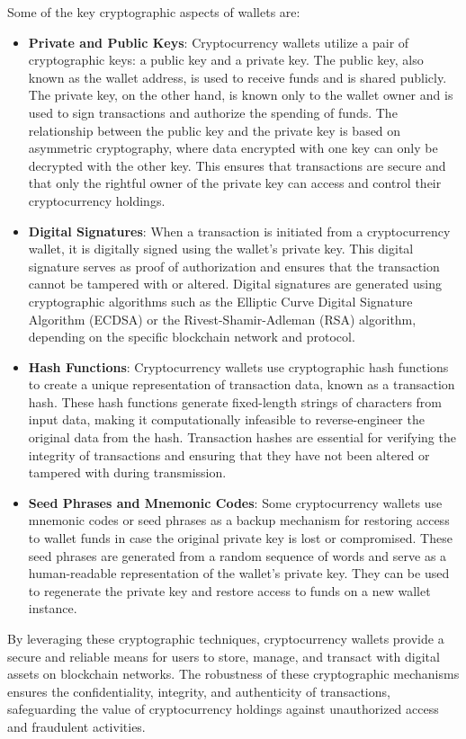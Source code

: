 Some of the key cryptographic aspects of wallets are:
\begin{itemize}
    \item \textbf{Private and Public Keys}: Cryptocurrency wallets utilize a pair of cryptographic keys: a public key and a private key. The public key, also known as the wallet address, is used to receive funds and is shared publicly. The private key, on the other hand, is known only to the wallet owner and is used to sign transactions and authorize the spending of funds. The relationship between the public key and the private key is based on asymmetric cryptography, where data encrypted with one key can only be decrypted with the other key. This ensures that transactions are secure and that only the rightful owner of the private key can access and control their cryptocurrency holdings.
    \item \textbf{Digital Signatures}: When a transaction is initiated from a cryptocurrency wallet, it is digitally signed using the wallet's private key. This digital signature serves as proof of authorization and ensures that the transaction cannot be tampered with or altered. Digital signatures are generated using cryptographic algorithms such as the Elliptic Curve Digital Signature Algorithm (ECDSA) or the Rivest-Shamir-Adleman (RSA) algorithm, depending on the specific blockchain network and protocol.
    \item \textbf{Hash Functions}: Cryptocurrency wallets use cryptographic hash functions to create a unique representation of transaction data, known as a transaction hash. These hash functions generate fixed-length strings of characters from input data, making it computationally infeasible to reverse-engineer the original data from the hash. Transaction hashes are essential for verifying the integrity of transactions and ensuring that they have not been altered or tampered with during transmission.
    \item \textbf{Seed Phrases and Mnemonic Codes}: Some cryptocurrency wallets use mnemonic codes or seed phrases as a backup mechanism for restoring access to wallet funds in case the original private key is lost or compromised. These seed phrases are generated from a random sequence of words and serve as a human-readable representation of the wallet's private key. They can be used to regenerate the private key and restore access to funds on a new wallet instance.
\end{itemize}

By leveraging these cryptographic techniques, cryptocurrency wallets provide a secure and reliable means for users to store, manage, and transact with digital assets on blockchain networks. The robustness of these cryptographic mechanisms ensures the confidentiality, integrity, and authenticity of transactions, safeguarding the value of cryptocurrency holdings against unauthorized access and fraudulent activities.

